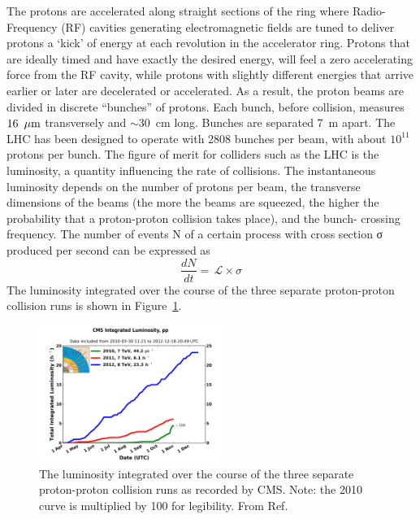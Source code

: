 \indent The protons are accelerated along straight sections of the ring where 
Radio-Frequency (RF) cavities generating electromagnetic fields are 
tuned to deliver protons a ‘kick’ of energy at each revolution in the accelerator ring. 
Protons that are ideally timed and have exactly the desired energy, will feel 
a zero accelerating force from the RF cavity, while protons with slightly different 
energies that arrive earlier or later are decelerated or accelerated. As a result, 
the proton beams are divided in discrete ``bunches'' of protons. Each bunch, before collision,
measures $16~\,\mu\text{m}$ transversely and $\sim\!\!30$~cm long. Bunches are separated 7~m apart.
The LHC has been designed to operate with 2808 bunches per beam, with about $10^{11}$ protons per bunch. 
The figure of merit for colliders such as the LHC is the luminosity, a quantity 
influencing the rate of collisions. The instantaneous luminosity depends on the number of protons
per beam, the transverse dimensions of the beams (the more the beams are squeezed,
the higher the probability that a proton-proton collision takes place), and the bunch-
crossing frequency. The number of events N of a certain process with cross section σ
produced per second can be expressed as
%
\begin{equation}
  \label{eq:lumi}
  \frac{dN}{dt} = \,\mathcal{L} \times \sigma
\end{equation}
%
The luminosity integrated over the course of the three separate proton-proton collision runs
is shown in Figure~\ref{fig:int_lumi}. 

\begin{figure}[h!]
  \begin{center}
      \includegraphics[width=0.53\textwidth,]{figures/int_lumi_cumulative_pp_2.png}
      \caption{\label{fig:int_lumi} The luminosity integrated over the course of the three 
      separate proton-proton collision runs as recorded by CMS.  
      Note: the 2010 curve is multiplied by 100 for legibility. From Ref.~\cite{cmsLumi}}
  \end{center}
\end{figure}

